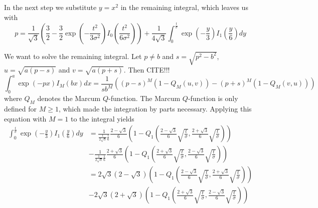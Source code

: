 \documentclass[a4paper,12pt]{article}
\theoremstyle{plain}
\theoremstyle{definition}
\theoremstyle{remark}
\begin{document}
In the next step we substitute $y = x^2$ in the remaining integral, which leaves us with
\begin{equation*}
	p = \frac{1}{\sqrt{3}} \left( \frac{3}{2} - \frac{3}{2} \exp \left( - \frac{t^2}{3 \sigma^2} \right) I_0 \left( \frac{t^2}{6 \sigma^2} \right) \right) + \frac{1}{4 \sqrt{3}} \int_0^\frac{t}{\sigma} \exp \left( - \frac{y}{3} \right) I_1 \left( \frac{y}{6} \right) dy
\end{equation*}

We want to solve the remaining integral. Let $p \neq b$ and $s = \sqrt{p^2 - b^2}$, $u = \sqrt{a (p - s)}$ and $v = \sqrt{a (p + s)}$. Then CITE!!!
\begin{equation*}
	\int_0^a \exp(-p x) I_M ( b x ) dx = \frac{1}{s b^M} \left( (p - s)^M ( 1 - Q_M(u, v) ) - (p + s)^M ( 1 - Q_M(v, u) ) \right)
\end{equation*}
where $Q_M$ denotes the Marcum $Q$-function. The Marcum $Q$-function is only defined for $M \geq 1$, which made the integration by parts necessary. Applying this equation with $M = 1$ to the integral yields
\begin{align*}
	\int_0^\frac{t}{\sigma} \exp \left( - \frac{y}{3} \right) I_1 \left( \frac{y}{6} \right) dy &= \frac{1}{\frac{1}{2 \sqrt{3}} \frac{1}{6}} \frac{2 - \sqrt{3}}{6} \left( 1 - Q_1 \left( \frac{2 - \sqrt{3}}{6} \sqrt{\frac{t}{\sigma}}, \frac{2 + \sqrt{3}}{6} \sqrt{\frac{t}{\sigma}} \right) \right) \\
	&- \frac{1}{\frac{1}{2 \sqrt{3}} \frac{1}{6}} \frac{2 + \sqrt{3}}{6} \left( 1 - Q_1 \left( \frac{2 + \sqrt{3}}{6} \sqrt{\frac{t}{\sigma}}, \frac{2 - \sqrt{3}}{6} \sqrt{\frac{t}{\sigma}} \right) \right) \\
	&= 2 \sqrt{3} (2 - \sqrt{3}) \left( 1 - Q_1 \left( \frac{2 - \sqrt{3}}{6} \sqrt{\frac{t}{\sigma}}, \frac{2 + \sqrt{3}}{6} \sqrt{\frac{t}{\sigma}} \right) \right) \\
	&- 2 \sqrt{3} (2 + \sqrt{3}) \left( 1 - Q_1 \left( \frac{2 + \sqrt{3}}{6} \sqrt{\frac{t}{\sigma}}, \frac{2 - \sqrt{3}}{6} \sqrt{\frac{t}{\sigma}} \right) \right)
\end{align*}
\end{document}
